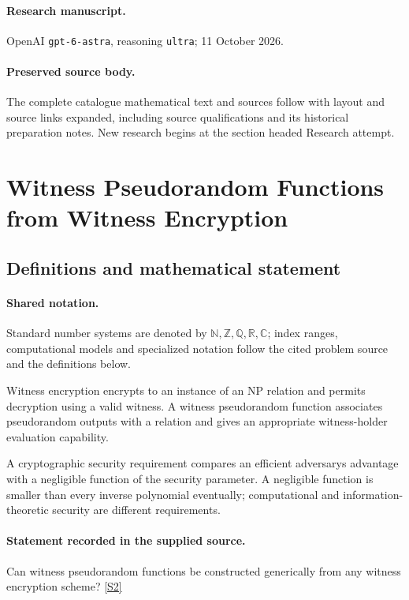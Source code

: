 \documentclass[11pt]{article}
\begin{document}
\paragraph{Research manuscript.} OpenAI \texttt{gpt-6-astra}, reasoning \texttt{ultra}; 11 October 2026.
\paragraph{Preserved source body.} The complete catalogue mathematical text and sources follow with layout and source links expanded, including source qualifications and its historical preparation notes. New research begins at the section headed Research attempt.

\section{Witness Pseudorandom Functions from Witness Encryption}\label{statement}

\subsection{Definitions and mathematical statement}

\paragraph{Shared notation.}Standard number systems are denoted by $\mathbb N,\mathbb Z,\mathbb Q,\mathbb R,\mathbb C$; index ranges, computational models and specialized notation follow the cited problem source and the definitions below.


Witness encryption encrypts to an instance of an NP relation and permits decryption using a valid witness. A witness pseudorandom function associates pseudorandom outputs with a relation and gives an appropriate witness-holder evaluation capability.

A cryptographic security requirement compares an efficient adversary\textquotesingle s advantage with a negligible function of the security parameter. A negligible function is smaller than every inverse polynomial eventually; computational and information-theoretic security are different requirements.
\paragraph{Statement recorded in the supplied source.}
Can witness pseudorandom functions be constructed generically from any witness encryption scheme? \href{https://doi.org/10.4171/owr/2014/35}{[S2]}
\end{document}
